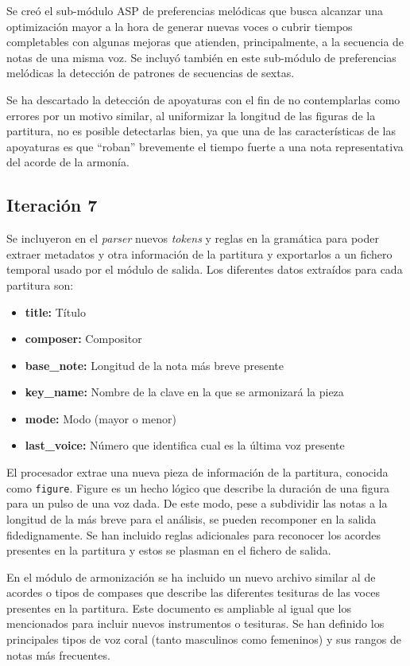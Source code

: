 Se creó el sub-módulo ASP de preferencias melódicas que busca alcanzar una optimización mayor a la hora de generar nuevas voces o cubrir tiempos completables con algunas mejoras que atienden, principalmente, a la secuencia de notas de una misma voz. Se incluyó también en este sub-módulo de preferencias melódicas la detección de patrones de secuencias de sextas.

Se ha descartado la detección de apoyaturas con el fin de no contemplarlas como errores por un motivo similar, al uniformizar la longitud de las figuras de la partitura, no es posible detectarlas bien, ya que una de las características de las apoyaturas es que ``roban'' brevemente el tiempo fuerte a una nota representativa del acorde de la armonía.

\subsection{Iteración 7}
\label{subsec:seventh_iteration}

Se incluyeron en el \textit{parser} nuevos \textit{tokens} y reglas en la gramática para poder extraer metadatos y otra información de la partitura y exportarlos a un fichero temporal usado por el módulo de salida. Los diferentes datos extraídos para cada partitura son:
\begin{itemize}
	\item \textbf{title:} Título
	\item \textbf{composer:} Compositor
	\item \textbf{base\_note:} Longitud de la nota más breve presente
	\item \textbf{key\_name:} Nombre de la clave en la que se armonizará la pieza
	\item \textbf{mode:} Modo (mayor o menor)
	\item \textbf{last\_voice:} Número que identifica cual es la última voz presente
\end{itemize}

El procesador extrae una nueva pieza de información de la partitura, conocida como \texttt{figure}. Figure es un hecho lógico que describe la duración de una figura para un pulso de una voz dada. De este modo, pese a subdividir las notas a la longitud de la más breve para el análisis, se pueden recomponer en la salida fidedignamente. Se han incluido reglas adicionales para reconocer los acordes presentes en la partitura y estos se plasman en el fichero de salida.

En el módulo de armonización se ha incluido un nuevo archivo similar al de acordes o tipos de compases que describe las diferentes tesituras de las voces presentes en la partitura. Este documento es ampliable al igual que los mencionados para incluir nuevos instrumentos o tesituras. Se han definido los principales tipos de voz coral (tanto masculinos como femeninos) y sus rangos de notas más frecuentes. 

